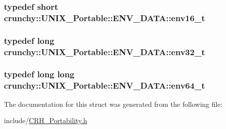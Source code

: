 \subsubsection[{env16\+\_\+t}]{\setlength{\rightskip}{0pt plus 5cm}typedef short {\bf crunchy\+::\+U\+N\+I\+X\+\_\+\+Portable\+::\+E\+N\+V\+\_\+\+D\+A\+T\+A\+::env16\+\_\+t}}\hypertarget{structcrunchy_1_1_u_n_i_x___portable_1_1_e_n_v___d_a_t_a_ad0f7a36599aa831e6f0186d0eab41e69}{}\label{structcrunchy_1_1_u_n_i_x___portable_1_1_e_n_v___d_a_t_a_ad0f7a36599aa831e6f0186d0eab41e69}
\subsubsection[{env32\+\_\+t}]{\setlength{\rightskip}{0pt plus 5cm}typedef long {\bf crunchy\+::\+U\+N\+I\+X\+\_\+\+Portable\+::\+E\+N\+V\+\_\+\+D\+A\+T\+A\+::env32\+\_\+t}}\hypertarget{structcrunchy_1_1_u_n_i_x___portable_1_1_e_n_v___d_a_t_a_ad3928f01a5462ef0064f802ab3b2d8a9}{}\label{structcrunchy_1_1_u_n_i_x___portable_1_1_e_n_v___d_a_t_a_ad3928f01a5462ef0064f802ab3b2d8a9}
\subsubsection[{env64\+\_\+t}]{\setlength{\rightskip}{0pt plus 5cm}typedef long long {\bf crunchy\+::\+U\+N\+I\+X\+\_\+\+Portable\+::\+E\+N\+V\+\_\+\+D\+A\+T\+A\+::env64\+\_\+t}}\hypertarget{structcrunchy_1_1_u_n_i_x___portable_1_1_e_n_v___d_a_t_a_acf3a73691f8290fd4c537863eb566167}{}\label{structcrunchy_1_1_u_n_i_x___portable_1_1_e_n_v___d_a_t_a_acf3a73691f8290fd4c537863eb566167}


The documentation for this struct was generated from the following file\+:\begin{DoxyCompactItemize}
\item 
include/\hyperlink{_c_r_h___portability_8h}{C\+R\+H\+\_\+\+Portability.\+h}\end{DoxyCompactItemize}
